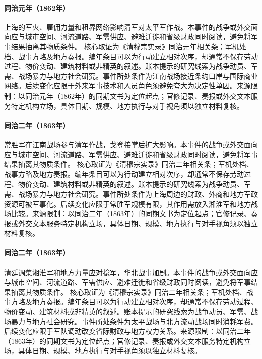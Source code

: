 \hypertarget{civic:EQ-1862-SHANGHAI-FOREIGN-ARMS}{}\paragraph{同治元年（1862年）}上海的军火、雇佣力量和租界网络影响清军对太平军作战。本事件的战争或外交面向应与城市空间、河流道路、军需供应、避难迁徙和省级财政同时阅读，避免将军事结果抽离其物质条件。 核心取证为《清穆宗实录》同治元年相关条；军机处档、战事方略及地方奏报。编年条目可以为行动建立相对次序，却通常不保存劳动过程、物价变动、建筑材料或非精英的叙述。账本提示的研究线索为战争动员、军需、战场暴力与地方社会研究。事件所处条件为江南战场接近条约口岸与国际商业网络。后续变化应限于外来军事技术和人员角色须避免夸大为决定性单因。来源限制：以同治元年（1862年）的同期文书为定位起点；官修记录、奏报或外交文本服务特定机构立场，具体日期、规模、地方执行与对手视角须以独立材料复核。
\hypertarget{civic:EQ-1863-EVER-VICTORIOUS-ARMY}{}\paragraph{同治二年（1863年）}常胜军在江南战场参与清军作战，戈登接掌后扩大影响。本事件的战争或外交面向应与城市空间、河流道路、军需供应、避难迁徙和省级财政同时阅读，避免将军事结果抽离其物质条件。 核心取证为《清穆宗实录》同治二年相关条；军机处档、战事方略及地方奏报。编年条目可以为行动建立相对次序，却通常不保存劳动过程、物价变动、建筑材料或非精英的叙述。账本提示的研究线索为战争动员、军需、战场暴力与地方社会研究。事件所处条件为上海周边的财政、外商和地方军政资源可被军事化。后续变化应限于常胜军规模有限，其作用需放入湘淮军和地方战场比较。来源限制：以同治二年（1863年）的同期文书为定位起点；官修记录、奏报或外交文本服务特定机构立场，具体日期、规模、地方执行与对手视角须以独立材料复核。
\hypertarget{civic:EQ-1863-NIAN-WAR-MOBILIZATION}{}\paragraph{同治二年（1863年）}清廷调集湘淮军和地方力量应对捻军，华北战事加剧。本事件的战争或外交面向应与城市空间、河流道路、军需供应、避难迁徙和省级财政同时阅读，避免将军事结果抽离其物质条件。 核心取证为《清穆宗实录》同治二年相关条；军机处档、战事方略及地方奏报。编年条目可以为行动建立相对次序，却通常不保存劳动过程、物价变动、建筑材料或非精英的叙述。账本提示的研究线索为战争动员、军需、战场暴力与地方社会研究。事件所处条件为太平战场与北方流动战场同时消耗军费。后续变化应限于军队调动改变省际财政与地方权力关系。来源限制：以同治二年（1863年）的同期文书为定位起点；官修记录、奏报或外交文本服务特定机构立场，具体日期、规模、地方执行与对手视角须以独立材料复核。
